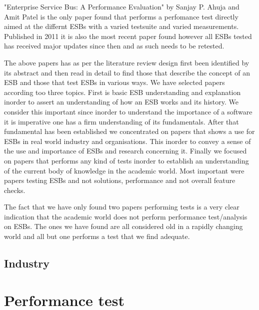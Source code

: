 \documentclass{llncs}
\begin{document}
"Enterprise Service Bus: A Performance Evaluation" \cite{Sanjay2011} by Sanjay P. Ahuja and Amit Patel  is the only paper found that performs a perfomance test directly aimed at the differnt ESBs with a varied testsuite and varied measurements. Published in 2011 it is also the most recent paper found however all ESBs tested has received major updates since then and as such needs to be retested.

The above papers has as per the literature review design first been identified by its abstract and then read in detail to find those that describe the concept of an ESB and those that test ESBs in various ways. We have selected papers according too three topics. First is basic ESB understanding and explanation inorder to assert an understanding of how an ESB works and its history. We consider this important since inorder to understand the importance of a software it is imperative one has a firm understanding of its fundamentals. After that fundamental has been established we concentrated on papers that shows a use for ESBs in real world industry and organisations. This inorder to convey a sense of the use and importance of ESBs and research concerning it.
Finally we focused on papers that performs any kind of tests inorder to establish an understanding of the current body of knowledge in the academic world. Most important were papers testing ESBs and not solutions, performance and not overall feature checks.


The fact that we have only found two papers performing tests is a very clear indication that the academic world does not perform performance test/analysis on ESBs. The ones we have found are all considered old in a rapidly changing world and all but one performs a test that we find adequate.


\subsection{Industry}

\section{Performance test}
\end{document}
